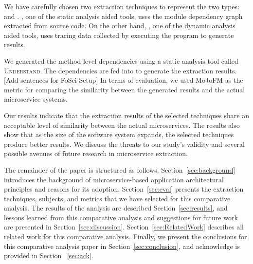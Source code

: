 We have carefully chosen two extraction techniques to represent the two types: \bn\cite{Mitchell:Mancoridis:2006} and \fs. \bn, one of the static analysis aided tools, uses the module dependency graph extracted from source code. On the other hand, \fs, one of the dynamic analysis aided tools, uses tracing data collected by executing the program to generate results.


We generated the method-level dependencies using a static analysis tool called \textsc{Understand}\cite{Scitools:Understand:2019}. The dependencies are fed into \bn to generate the extraction results. [Add sentences for FoSci Setup] In terms of evaluation, we used MoJoFM as the metric for comparing the similarity between the generated results and the actual microservice systems.


Our results indicate that the extraction results of the selected techniques share an acceptable level of similarity between the actual microservices. The results also show that as the size of the software system expands, the selected techniques produce better results. We discuss the threats to our study's validity and several possible avenues of future research in microservice extraction. 

The remainder of the paper is structured as follows. Section~\ref{sec:background} introduces the background of microservice-based application architectural principles and reasons for its adoption. Section~\ref{sec:eval} presents the extraction techniques, subjects, and metrics that we have selected for this comparative analysis. The results of the analysis are described Section~\ref{sec:results}, and lessons learned from this comparative analysis and suggestions for future work are presented in Section~\ref{sec:discussion}. Section~\ref{sec:RelatedWork} describes all related work for this comparative analysis. Finally, we present the conclusions for this comparative analysis paper in Section~\ref{sec:conclusion}, and acknowledge is provided in Section ~\ref{sec:ack}. 

